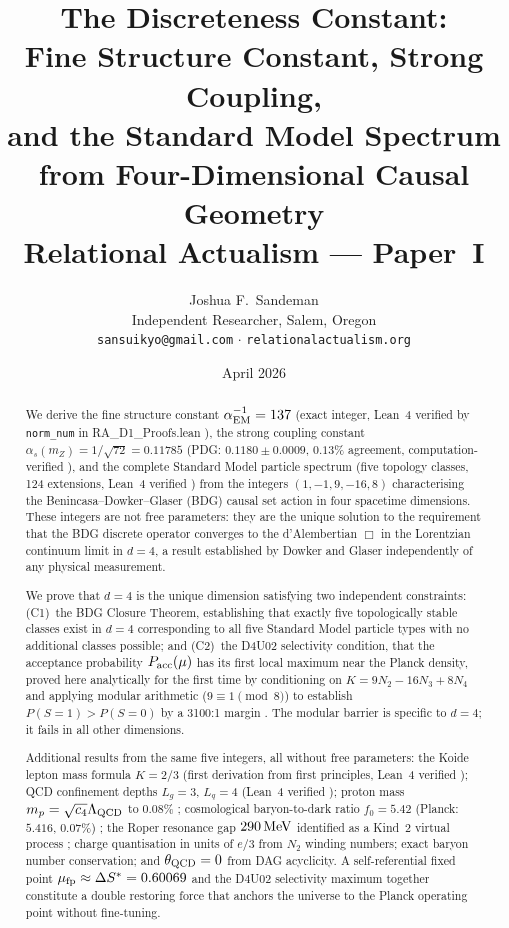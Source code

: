 \documentclass[12pt,a4paper]{article}
\title{\textbf{The Discreteness Constant:\\
Fine Structure Constant, Strong Coupling,\\and the Standard Model Spectrum\\
from Four-Dimensional Causal Geometry}\\[0.6em]
\large\normalfont Relational Actualism --- Paper~I}
\author{Joshua F.~Sandeman\\[0.4em]
\small Independent Researcher, Salem, Oregon\\
\small \texttt{sansuikyo@gmail.com} $\cdot$ \texttt{relationalactualism.org}}
\date{April 2026}
\begin{document}
\maketitle

\begin{abstract}
We derive the fine structure constant $\alpha_{\rm EM}^{-1}=137$ (exact integer, Lean~4 verified by \texttt{norm\_num} in RA\_D1\_Proofs.lean \statusLV), the strong coupling constant $\alpha_s(m_Z)=1/\sqrt{72}=0.11785$ (PDG: $0.1180\pm0.0009$, $0.13\%$ agreement, computation-verified \statusCV), and the complete Standard Model particle spectrum (five topology classes, 124 extensions, Lean~4 verified \statusLV) from the integers $(1,-1,9,-16,8)$ characterising the Benincasa--Dowker--Glaser (BDG) causal set action in four spacetime dimensions.  These integers are not free parameters: they are the unique solution to the requirement that the BDG discrete operator converges to the d'Alembertian $\Box$ in the Lorentzian continuum limit in $d=4$, a result established by Dowker and Glaser \cite{Dowker2013} independently of any physical measurement.

We prove that $d=4$ is the unique dimension satisfying two independent constraints: (C1)~the BDG Closure Theorem, establishing that exactly five topologically stable classes exist in $d=4$ corresponding to all five Standard Model particle types with no additional classes possible; and (C2)~the D4U02 selectivity condition, that the acceptance probability $P_{\rm acc}(\mu)$ has its first local maximum near the Planck density, proved here analytically for the first time by conditioning on $K=9N_2-16N_3+8N_4$ and applying modular arithmetic ($9\equiv1\pmod8$) to establish $P(S=1)>P(S=0)$ by a 3100:1 margin \statusDR.  The modular barrier is specific to $d=4$; it fails in all other dimensions.

Additional results from the same five integers, all without free parameters: the Koide lepton mass formula $K=2/3$ (first derivation from first principles, Lean~4 verified \statusLV); QCD confinement depths $L_g=3$, $L_q=4$ (Lean~4 verified \statusLV); proton mass $m_p=\sqrt{c_4}\Lambda_{\rm QCD}$ to $0.08\%$ \statusCV; cosmological baryon-to-dark ratio $f_0=5.42$ (Planck: $5.416$, $0.07\%$) \statusCV; the Roper resonance gap $290\,{\rm MeV}$ identified as a Kind~2 virtual process \statusCV; charge quantisation in units of $e/3$ from $N_2$ winding numbers; exact baryon number conservation; and $\theta_{\rm QCD}=0$ from DAG acyclicity.  A self-referential fixed point $\mu_{\rm fp}\approx\Delta S^*=0.60069$ and the D4U02 selectivity maximum together constitute a double restoring force that anchors the universe to the Planck operating point without fine-tuning.
\end{abstract}
\end{document}
